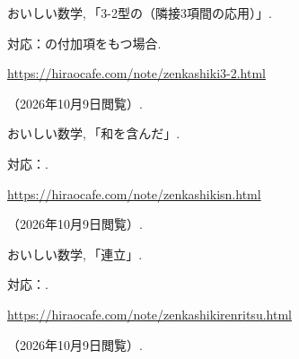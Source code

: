 \begin{enumerate}[resume,label={[\arabic*]}]
    \item \begin{minipage}[t]{\linewidth}\raggedright
        おいしい数学,\,「3-2型の（隣接3項間の応用）」.
        \par{\small 対応：の付加項をもつ場合.\par}
        \par\noindent\url{https://hiraocafe.com/note/zenkashiki3-2.html}\par
        \noindent（2026年10月9日閲覧）.
      \end{minipage}\par\smallskip

    \item \begin{minipage}[t]{\linewidth}\raggedright
        おいしい数学,\,「和を含んだ」.
        \par{\small 対応：.\par}
        \par\noindent\url{https://hiraocafe.com/note/zenkashikisn.html}\par
        \noindent（2026年10月9日閲覧）.
      \end{minipage}\par\smallskip

    \item \begin{minipage}[t]{\linewidth}\raggedright
        おいしい数学,\,「連立」.
        \par{\small 対応：.\par}
        \par\noindent\url{https://hiraocafe.com/note/zenkashikirenritsu.html}\par
        \noindent（2026年10月9日閲覧）.
      \end{minipage}\par\smallskip

  \end{enumerate}

